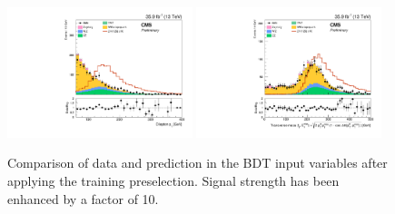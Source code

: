 \begin{figure}[htbp]
\begin{center}
\includegraphics[width=0.48\textwidth]{figures/mva_ptll_nice.pdf}
\includegraphics[width=0.48\textwidth]{figures/mva_mTl1MET_nice.pdf}
\caption{Comparison of data and prediction in the BDT input variables after applying the training preselection. Signal strength has been enhanced by a factor of 10.}
\label{fig:bdt_inputvar_histos}
\end{center}
\end{figure}
